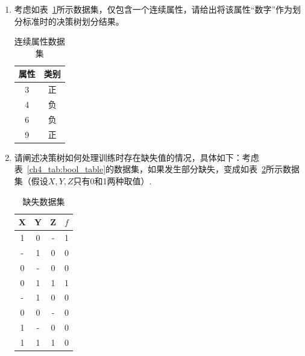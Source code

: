\documentclass[answers]{exam}  %
\begin{document}
\begin{questions}
    \begin{enumerate}
        \item
              考虑如表~\ref{ch4_tab:continuous_small_dataset}所示数据集，仅包含一个连续属性，请给出将该属性“数字”作为划分标准时的决策树划分结果。
              \begin{table}[h]
                  \begin{center}
                      \begin{tabular}{cc}
                          \hline 属性 & 类别 \\
                          \hline 3    & 正   \\
                          4           & 负   \\
                          6           & 负   \\
                          9           & 正   \\
                          \hline
                      \end{tabular}
                      \caption{连续属性数据集}\label{ch4_tab:continuous_small_dataset}
                  \end{center}
              \end{table}
        \item 请阐述决策树如何处理训练时存在缺失值的情况，具体如下：考虑表~\ref{ch4_tab:bool_table}的数据集，如果发生部分缺失，变成如表~\ref{ch4_tab:missing_dataset}所示数据集（假设$X, Y, Z$只有0和1两种取值）.
              \begin{table}[ht]
                  \centering
                  \caption{缺失数据集}\label{ch4_tab:missing_dataset}
                  \begin{tabular}{ccc|c}
                      \hline X & Y & Z & $f$ \\
                      \hline
                      1        & 0 & - & 1   \\
                      -        & 1 & 0 & 0   \\
                      0        & - & 0 & 0   \\
                      0        & 1 & 1 & 1   \\
                      -        & 1 & 0 & 0   \\
                      0        & 0 & - & 0   \\
                      1        & - & 0 & 0   \\
                      1        & 1 & 1 & 0   \\
                      \hline

\end{tabular}
\end{table}
\end{enumerate}
\end{questions}
\end{document}

